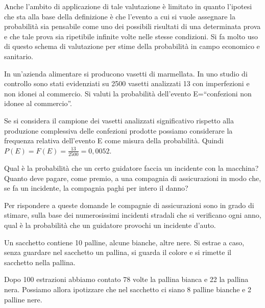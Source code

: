 Anche l'ambito di applicazione di tale valutazione è limitato in quanto 
l'ipotesi che sta alla base della definizione è che l'evento a cui si vuole 
assegnare la probabilità sia pensabile come uno dei possibili risultati di 
una 
determinata prova e che tale prova sia ripetibile infinite volte nelle stesse 
condizioni.
Si fa molto uso di questo schema di valutazione per stime della probabilità 
in 
campo economico e sanitario.

\begin{esempio}
In un'azienda alimentare si producono vasetti di marmellata. In uno studio di 
controllo sono stati evidenziati su 2500 vasetti analizzati 13 con 
imperfezioni 
e non idonei al commercio. Si valuti la probabilità dell'evento 
E=``confezioni 
non idonee al commercio''.

Se si considera il campione dei vasetti analizzati significativo rispetto 
alla 
produzione complessiva delle confezioni prodotte possiamo considerare la 
frequenza relativa dell'evento E come misura della probabilità. Quindi 
$P(E)=F(E)=\frac{13}{2500}=0,0052$.
\end{esempio}

\begin{esempio}
Qual è la probabilità che un certo guidatore faccia un incidente con la 
macchina? Quanto deve pagare, come premio, a una compagnia di assicurazioni 
in 
modo che, se fa un incidente, la compagnia paghi per intero il danno?

Per rispondere a queste domande le compagnie di assicurazioni sono in grado 
di 
stimare, sulla base dei numerosissimi incidenti stradali che si verificano 
ogni 
anno, qual è la probabilità che un guidatore provochi un incidente d'auto.
\end{esempio}

\begin{esempio}
Un sacchetto contiene 10 palline, alcune bianche, altre nere. Si estrae a 
caso, 
senza guardare nel sacchetto un pallina, si guarda il colore e si rimette il 
sacchetto nella pallina.

Dopo 100 estrazioni abbiamo contato 78 volte la pallina bianca e 22 la 
pallina 
nera. Possiamo allora ipotizzare che nel sacchetto ci siano 8 palline bianche 
e 
2 palline nere.
\end{esempio}

